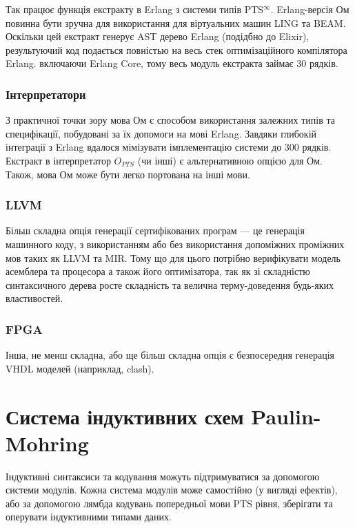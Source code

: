 Так працює функція екстракту в Erlang з системи типів PTS$^\infty$.
Erlang-версія Ом повинна бути зручна для використання для
віртуальних машин LING та BEAM. Оскільки цей екстракт генерує
AST дерево Erlang (подідбно до Elixir), результуючий код
подається повністью на весь стек оптимізаційного компілятора
Erlang. включаючи Erlang Core, тому весь модуль екстракта займає 30 рядків.

\subsubsection{Інтерпретатори}
З практичної точки зору мова Ом є способом використання залежних типів
та специфікації, побудовані за їх допомоги на мові Erlang.
Завдяки глибокій інтеграції з Erlang вдалося мімізувати імплементацію системи до 300 рядків.
Екстракт в інтерпретатор $O_{PTS}$ (чи інші) є альтернативною опцією для Ом.
Також, мова Ом може бути легко портована на інші мови.

\subsubsection{LLVM}
Більш складна опція генерації сертифікованих програм --- це генерація машинного коду,
з використанням або без використання допоміжних проміжних мов таких як LLVM та MIR.
Тому що для цього потрібно верифікувати модель асемблера та процесора а також
його оптимізатора, так як зі складністю синтаксичного дерева росте складність
та велична терму-доведення будь-яких властивостей.

\subsubsection{FPGA}
Інша, не менш складна, або ще більш складна опція є безпосередня генерація
VHDL моделей (наприклад, clash).

\newpage
\section{Система індуктивних схем Paulin-Mohring}
Індуктивні синтаксиси та кодування можуть підтримуватися за допомогою системи модулів.
Кожна система модулів може самостійно (у вигляді ефектів), або за допомогою лямбда кодувань
попередньої мови PTS рівня, зберігати та оперувати індуктивними типами даних.

